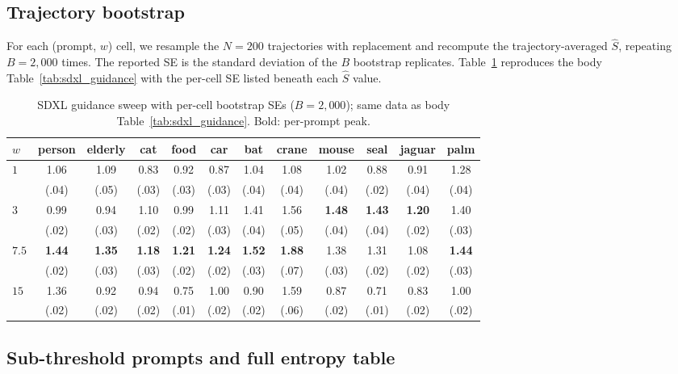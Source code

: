 \documentclass{article}
\begin{document}
\subsection{Trajectory bootstrap}
\label{app:sdxl_bootstrap}

For each (prompt, $w$) cell, we resample the $N = 200$ trajectories
with replacement and recompute the trajectory-averaged $\hat S$,
repeating $B = 2{,}000$ times. The reported SE is the standard
deviation of the $B$ bootstrap replicates. Table~\ref{tab:sdxl_guidance_full} reproduces the body Table~\ref{tab:sdxl_guidance} with the per-cell SE listed beneath each $\hat S$ value.

\begin{table}[H]
\centering
\caption{SDXL guidance sweep with per-cell bootstrap SEs ($B = 2{,}000$); same data as body Table~\ref{tab:sdxl_guidance}. Bold: per-prompt peak.}
\label{tab:sdxl_guidance_full}
\begin{tabular}{@{}lccccccccccc@{}}
\toprule
$w$ & person & elderly & cat & food & car & bat & crane & mouse & seal & jaguar & palm \\
\midrule
$1$   & 1.06 & 1.09 & 0.83 & 0.92 & 0.87 & 1.04 & 1.08 & 1.02 & 0.88 & 0.91 & 1.28 \\
      & (.04) & (.05) & (.03) & (.03) & (.03) & (.04) & (.04) & (.04) & (.02) & (.04) & (.04) \\
\midrule
$3$   & 0.99 & 0.94 & 1.10 & 0.99 & 1.11 & 1.41 & 1.56 & \textbf{1.48} & \textbf{1.43} & \textbf{1.20} & 1.40 \\
      & (.02) & (.03) & (.02) & (.02) & (.03) & (.04) & (.05) & (.04) & (.04) & (.02) & (.03) \\
\midrule
$7.5$ & \textbf{1.44} & \textbf{1.35} & \textbf{1.18} & \textbf{1.21} & \textbf{1.24} & \textbf{1.52} & \textbf{1.88} & 1.38 & 1.31 & 1.08 & \textbf{1.44} \\
      & (.02) & (.03) & (.03) & (.02) & (.02) & (.03) & (.07) & (.03) & (.02) & (.02) & (.03) \\
\midrule
$15$  & 1.36 & 0.92 & 0.94 & 0.75 & 1.00 & 0.90 & 1.59 & 0.87 & 0.71 & 0.83 & 1.00 \\
      & (.02) & (.02) & (.02) & (.01) & (.02) & (.02) & (.06) & (.02) & (.01) & (.02) & (.02) \\
\bottomrule
\end{tabular}
\end{table}

\subsection{Sub-threshold prompts and full entropy table}
\label{app:sdxl_subgaussian}
\end{document}
